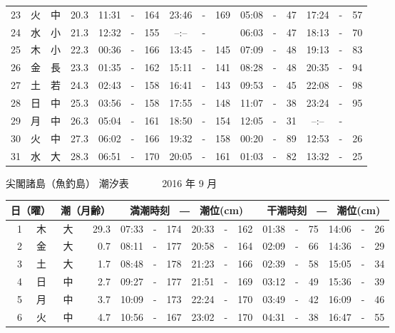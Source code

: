\documentclass[12pt.a4j]{jsarticle}
\begin{document}
\begin{center}
\begin{table}[ht]
\begin{tabular}{|rc|cr|ccrccr|ccrccr|}
23 & 火 & 中 & 20.3 &  11:31 &-& 164  &  23:46 &-& 169  &   05:08 &-&  47  &   17:24 &-&  57  \\
24 & 水 & 小 & 21.3 &  12:32 &-& 155  &  --:-- &-&     &   06:03 &-&  47  &   18:13 &-&  70  \\
25 & 木 & 小 & 22.3 &  00:36 &-& 166  &  13:45 &-& 145  &   07:09 &-&  48  &   19:13 &-&  83  \\
26 & 金 & 長 & 23.3 &  01:35 &-& 162  &  15:11 &-& 141  &   08:28 &-&  48  &   20:35 &-&  94  \\
27 & 土 & 若 & 24.3 &  02:43 &-& 158  &  16:41 &-& 143  &   09:53 &-&  45  &   22:08 &-&  98  \\
28 & 日 & 中 & 25.3 &  03:56 &-& 158  &  17:55 &-& 148  &   11:07 &-&  38  &   23:24 &-&  95  \\
29 & 月 & 中 & 26.3 &  05:04 &-& 161  &  18:50 &-& 154  &   12:05 &-&  31  &   --:-- &-&     \\
30 & 火 & 中 & 27.3 &  06:02 &-& 166  &  19:32 &-& 158  &   00:20 &-&  89  &   12:53 &-&  26  \\
31 & 水 & 大 & 28.3 &  06:51 &-& 170  &  20:05 &-& 161  &   01:03 &-&  82  &   13:32 &-&  25  \\
   \hline
   \end{tabular}
\end{table}
\newpage
 {\LARGE 尖閣諸島（魚釣島）  潮汐表　　　}
 {\large 2016 年  9 月}\\
 \begin{table}[ht]
    \begin{tabular}{|rc|cr|ccrccr|ccrccr|}
    \hline
    \multicolumn{2}{|c|}{日（曜）} & \multicolumn{2}{c|}{潮（月齢）} & \multicolumn{6}{c|}{満潮時刻　―　潮位(cm)} & \multicolumn{6}{c|}{干潮時刻　―　潮位(cm)} \\
 \hline
 1 & 木 & 大 & 29.3 &  07:33 &-& 174  &  20:33 &-& 162  &   01:38 &-&  75  &   14:06 &-&  26  \\
 2 & 金 & 大 &  0.7 &  08:11 &-& 177  &  20:58 &-& 164  &   02:09 &-&  66  &   14:36 &-&  29  \\
 3 & 土 & 大 &  1.7 &  08:48 &-& 178  &  21:23 &-& 166  &   02:39 &-&  58  &   15:05 &-&  34  \\
 4 & 日 & 中 &  2.7 &  09:27 &-& 177  &  21:51 &-& 169  &   03:12 &-&  49  &   15:36 &-&  39  \\
 5 & 月 & 中 &  3.7 &  10:09 &-& 173  &  22:24 &-& 170  &   03:49 &-&  42  &   16:09 &-&  46  \\
 6 & 火 & 中 &  4.7 &  10:56 &-& 167  &  23:02 &-& 170  &   04:31 &-&  38  &   16:47 &-&  55  \\

\end{tabular}
\end{table}
\end{center}
\end{document}
